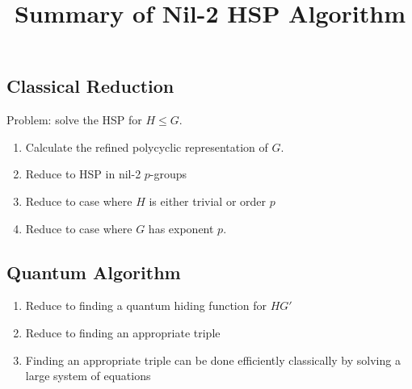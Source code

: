 \documentclass{article}
\title{Summary of Nil-2 HSP Algorithm}
\begin{document}
\maketitle

\subsection{Classical Reduction}

Problem: solve the HSP for $H \leq G$.

\begin{enumerate}
\item Calculate the refined polycyclic representation of $G$.
\item Reduce to HSP in nil-2 $p$-groups
\item Reduce to case where $H$ is either trivial or order $p$
\item Reduce to case where $G$ has exponent $p$.
\end{enumerate}


\subsection{Quantum Algorithm}
\begin{enumerate}
\item Reduce to finding a quantum hiding function for  $HG'$
\item Reduce to finding an appropriate triple
\item Finding an appropriate triple can be done efficiently classically 
  by solving a large system of equations
\end{enumerate}
\end{document}

